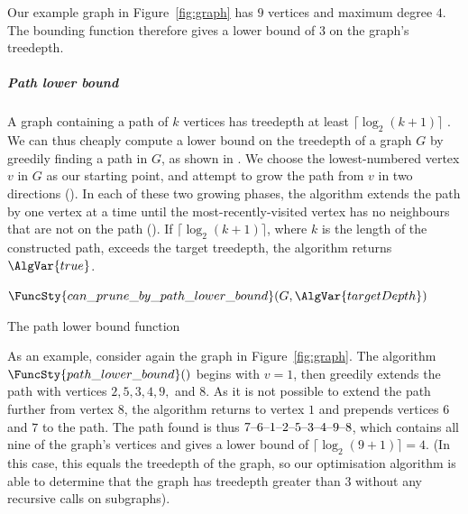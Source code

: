 {    Our example graph in Figure~\ref{fig:graph} has $9$ vertices and maximum degree $4$.
    The bounding function therefore gives a lower bound of 3 on the graph's treedepth.

    \subparagraph*{Path lower bound}

    A graph containing a path of $k$ vertices has treedepth at least
    $\lceil \log_2(k+1)\rceil$ \cite{DBLP:books/daglib/0030491}.  We can thus cheaply
    compute a lower bound on the treedepth of a graph $G$ by greedily
    finding a path in $G$, as shown in .
    We choose the lowest-numbered vertex $v$ in $G$ as our starting point, and
    attempt to grow the path from $v$ in two directions ().
    In each of these two growing phases, the algorithm extends the path
    by one vertex at a time until the most-recently-visited vertex has no
    neighbours that are not on the path ().
    If $\lceil \log_2(k+1)\rceil$, where $k$ is the length of the constructed path,
    exceeds the target treedepth, the algorithm returns $\AlgVar{true}$.

    {
    \begin{algorithm}[htb]
     \footnotesize
    \DontPrintSemicolon
    \newcommand\PathLowerBound{\FuncSty{can\_prune\_by\_path\_lower\_bound}}
    \nl $\PathLowerBound(G, \AlgVar{targetDepth})$ \label{path_lower_bound_fun} \;
    \nl {}
    \caption{The path lower bound function}
    \label{PathLowerBoundAlgorithm}
    \end{algorithm}
    }

    As an example, consider again the graph in Figure~\ref{fig:graph}.  The
    algorithm $\FuncSty{path\_lower\_bound}()$ begins with $v=1$, then greedily
    extends the path with vertices $2, 5, 3, 4, 9,$ and $8$.  As it is not
    possible to extend the path further from vertex $8$, the algorithm returns
    to vertex $1$ and prepends vertices $6$ and $7$ to the path.  The path found
    is thus $7\text{--} 6\text{--} 1\text{--} 2\text{--} 5\text{--} 3\text{--} 4\text{--} 9\text{--} 8$, which contains
    all nine of the graph's vertices and gives a lower bound of $\lceil \log_2(9+1)\rceil = 4$.
    (In this case, this equals the treedepth of the graph, so our optimisation algorithm is
    able to determine that the graph has treedepth greater than 3 without any recursive calls
    on subgraphs).

}
